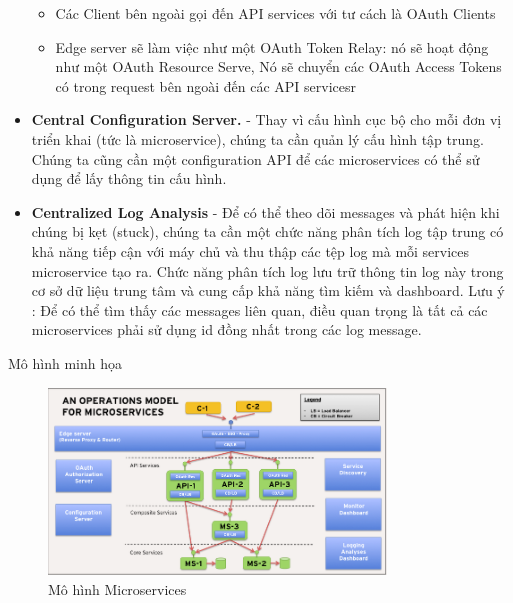 \begin{itemize}
\begin{itemize}
	            \item Các Client bên ngoài gọi đến API services với tư cách là OAuth Clients
	            \item Edge server sẽ làm việc như một OAuth Token Relay: nó sẽ hoạt động như một OAuth Resource Serve, Nó sẽ chuyển các OAuth Access Tokens có trong request bên ngoài đến các API servicesr
	        \end{itemize}
	        \item \textbf{Central Configuration Server.} - Thay vì cấu hình cục bộ cho mỗi đơn vị triển khai (tức là microservice), chúng ta cần quản lý cấu hình tập trung. Chúng ta cũng cần một configuration API để các microservices có thể sử dụng để lấy thông tin cấu hình.
	        \item \textbf{Centralized Log Analysis} - Để có thể theo dõi messages và phát hiện khi chúng bị kẹt (stuck), chúng ta cần một chức năng phân tích log tập trung có khả năng tiếp cận với máy chủ và thu thập các tệp log mà mỗi services microservice tạo ra. Chức năng phân tích log lưu trữ thông tin log này trong cơ sở dữ liệu trung tâm và cung cấp khả năng tìm kiếm và dashboard. Lưu ý : Để có thể tìm thấy các messages liên quan, điều quan trọng là tất cả các microservices phải sử dụng id đồng nhất trong các log message.
		\end{itemize}
		Mô hình minh họa\\
		
		\newpage
		
		\begin{figure}[!ht]
			\includegraphics[width=0.8\textwidth]{Images/model-microservice.png}
			\centering
			\linebreak
			\caption{Mô hình Microservices}
		\end{figure}
	
		
		\newpage
